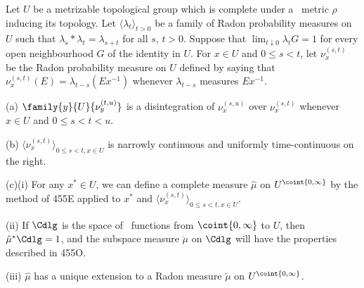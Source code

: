  Let $U$ be a metrizable
topological group which is complete
under a \rti\ metric $\rho$ inducing its topology.
Let $\langle\lambda_t\rangle_{t>0}$
be a family of Radon probability measures
on $U$ such that $\lambda_s*\lambda_t=\lambda_{s+t}$ for all $s$, $t>0$.
Suppose that $\lim_{t\downarrow 0}\lambda_tG=1$ for every open
neighbourhood $G$ of the identity in $U$.
For $x\in U$ and $0\le s<t$, let $\nu^{(s,t)}_x$ be the Radon probability
measure on $U$ defined by saying that
$\nu^{(s,t)}_x(E)=\lambda_{t-s}(Ex^{-1})$ whenever $\lambda_{t-s}$ measures
$Ex^{-1}$.

(a) $\family{y}{U}{\nu^{(t,u)}_y}$ is a disintegration of $\nu^{(s,u)}_x$
over $\nu^{(s,t)}_x$ whenever $x\in U$ and $0\le s<t<u$.

(b) $\langle\nu^{(s,t)}_x\rangle_{0\le s<t,x\in U}$ is narrowly continuous
and uniformly time-continuous on the right.

(c)(i) For any $x^*\in U$, we can define a complete measure
$\hat\mu$ on $U^{\coint{0,\infty}}$ by the method of 455E applied to
$x^*$ and $\langle\nu^{(s,t)}_x\rangle_{0\le s<t,x\in U}$.

\quad(ii) If $\Cdlg$ is the space of \cadlag\ functions from
$\coint{0,\infty}$ to $U$, then $\hat\mu^*\Cdlg=1$, and the subspace
measure $\ddot\mu$ on $\Cdlg$ will have the properties described in 455O.

\quad(iii) $\hat\mu$ has a unique extension to a Radon measure $\tilde\mu$
on $U^{\coint{0,\infty}}$.

